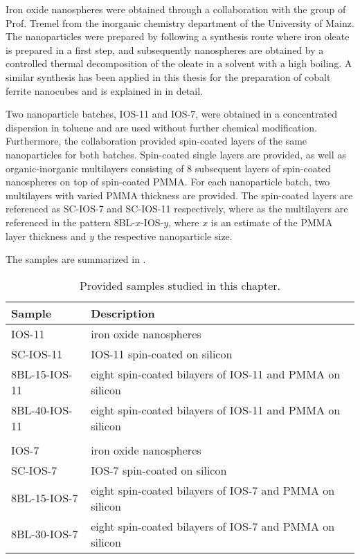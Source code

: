 \documentclass[\main/dresen_thesis.tex]{subfiles}
\begin{document}
  Iron oxide nanospheres were obtained through a collaboration with the group of Prof. Tremel from the inorganic chemistry department of the University of Mainz.
  The nanoparticles were prepared by following a synthesis route where iron oleate is prepared in a first step, and subsequently nanospheres are obtained by a controlled thermal decomposition of the oleate in a solvent with a high boiling.
  A similar synthesis has been applied in this thesis for the preparation of cobalt ferrite nanocubes and is explained in  in detail.

  Two nanoparticle batches, IOS-11 and IOS-7, were obtained in a concentrated dispersion in toluene and are used without further chemical modification.
  Furthermore, the collaboration provided spin-coated layers of the same nanoparticles for both batches.
  Spin-coated single layers are provided, as well as organic-inorganic multilayers consisting of 8 subsequent layers of spin-coated nanospheres on top of spin-coated PMMA.
  For each nanoparticle batch, two multilayers with varied PMMA thickness are provided.
  The spin-coated layers are referenced as SC-IOS-7 and SC-IOS-11 respectively, where as the multilayers are referenced in the pattern 8BL-$x$-IOS-$y$, where $x$ is an estimate of the PMMA layer thickness and $y$ the respective nanoparticle size.

  The samples are summarized in .
  \begin{table}[!htbp]
    \centering
    \caption{\label{tab:looselyPackedNS:expMethods:samples}Provided samples studied in this chapter.}
    \begin{tabular}{ l | l }
      \textbf{Sample}  & Description \\
      \hline
      IOS-11        & iron oxide nanospheres\\
      SC-IOS-11     & IOS-11 spin-coated on silicon\\
      8BL-15-IOS-11 & eight spin-coated bilayers of IOS-11 and PMMA on silicon\\
      8BL-40-IOS-11 & eight spin-coated bilayers of IOS-11 and PMMA on silicon\\
      \\
      IOS-7         & iron oxide nanospheres\\
      SC-IOS-7      & IOS-7 spin-coated on silicon\\
      8BL-15-IOS-7  & eight spin-coated bilayers of IOS-7 and PMMA on silicon\\
      8BL-30-IOS-7  & eight spin-coated bilayers of IOS-7 and PMMA on silicon\\
      \hline
    \end{tabular}
  \end{table}
\end{document}

